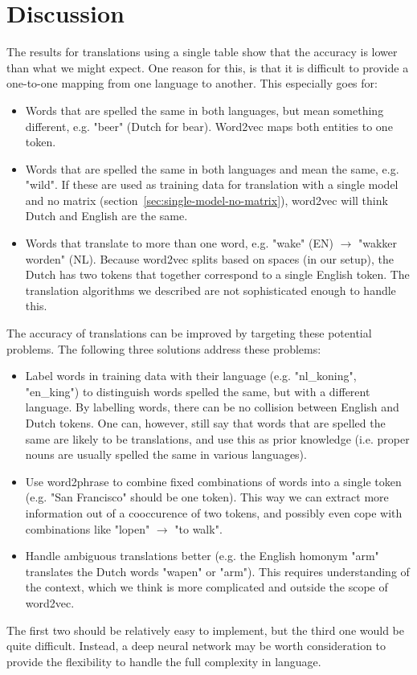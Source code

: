 \section{Discussion}
\label{sec:discussion}
The results for translations using a single table show that the accuracy is lower than what we might expect. One reason for this, is that it is difficult to provide a one-to-one mapping from one language to another. This especially goes for:
\begin{itemize}
\item Words that are spelled the same in both languages, but mean something different, e.g. "beer" (Dutch for bear). Word2vec maps both entities to one token.
\item Words that are spelled the same in both languages and mean the same, e.g. "wild". If these are used as training data for translation with a single model and no matrix (section~\ref{sec:single-model-no-matrix}), word2vec will think Dutch and English are the same.
\item Words that translate to more than one word, e.g. "wake" (EN) $\to$ "wakker worden" (NL). Because word2vec splits based on spaces (in our setup), the Dutch has two tokens that together correspond to a single English token. The translation algorithms we described are not sophisticated enough to handle this.
\end{itemize}

The accuracy of translations can be improved by targeting these potential problems. The following three solutions address these problems:

\begin{itemize}
\item Label words in training data with their language (e.g. "nl\_koning", "en\_king") to distinguish words spelled the same, but with a different language. By labelling words, there can be no collision between English and Dutch tokens. One can, however, still say that words that are spelled the same are likely to be translations, and use this as prior knowledge (i.e. proper nouns are usually spelled the same in various languages).
\item Use word2phrase to combine fixed combinations of words into a single token (e.g. "San Francisco" should be one token). This way we can extract more information out of a cooccurence of two tokens, and possibly even cope with combinations like "lopen" $\to$ "to walk".
\item Handle ambiguous translations better (e.g. the English homonym "arm" translates the Dutch words "wapen" or "arm"). This requires understanding of the context, which we think is more complicated and outside the scope of word2vec.
\end{itemize}

The first two should be relatively easy to implement, but the third one would be quite difficult. Instead, a deep neural network may be worth consideration to provide the flexibility to handle the full complexity in language.